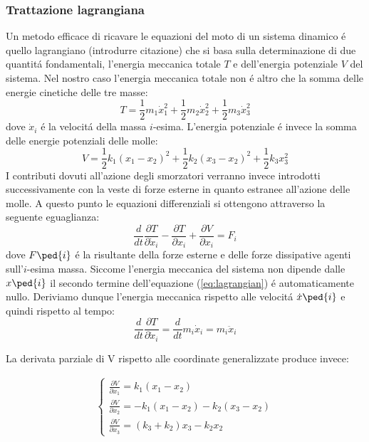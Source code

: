 \documentclass[12pt,a4paper]{article}
\begin{document}
 	\subsubsection[Lagrangiana]{Trattazione lagrangiana}
 		Un metodo efficace di ricavare le equazioni del moto di un sistema dinamico \'e quello lagrangiano (introdurre citazione) che si basa sulla determinazione di due quantit\'a fondamentali, l'energia meccanica totale $T$ e dell'energia potenziale $V$ del sistema. Nel nostro caso l'energia meccanica totale non \'e altro che la somma delle energie cinetiche delle tre masse:
 		\begin{equation}
 			T= \frac{1}{2} m_1 \dot x_1^2 +\frac{1}{2} m_2 \dot x_2^2+ \frac{1}{2}m_3 \dot x_3^2 
 			\label{eq:mechanical-energy}
 		\end{equation}
 		dove $\dot x_i$ \'e la velocit\'a della massa $i$-esima.
 		L'energia potenziale \'e invece la somma delle energie potenziali delle molle:
 		\begin{equation}
 			V= \frac{1}{2} k_1(x_1-x_2)^2+\frac{1}{2} k_2(x_3-x_2)^2 + \frac{1}{2} k_3 x_3^2
 			\label{eq:potential-energy}
 		\end{equation}
 		I contributi dovuti all'azione degli smorzatori verranno invece introdotti successivamente con la veste di forze esterne in quanto estranee all'azione delle molle.
 		A questo punto le equazioni differenziali si ottengono attraverso la seguente eguaglianza: 		
 		\begin{equation}
 			\frac{d}{dt} \frac{\partial T}{\partial \dot x_i} - \frac{\partial T}{\partial x_i} + \frac{\partial V}{\partial x_i}=F_i
 			\label{eq:lagrangian}
 		\end{equation}
 		dove $F\ped{i}$ \'e la risultante della forze esterne e delle forze dissipative agenti sull'$i$-esima massa. Siccome l'energia meccanica del sistema non dipende dalle $x\ped{i}$ il secondo termine dell'equazione (\ref{eq:lagrangian}) \'e automaticamente nullo. Deriviamo dunque l'energia meccanica rispetto alle velocit\'a $\dot x\ped{i}$ e quindi rispetto al tempo:
 		\begin{equation}
 			\frac{d}{dt} \frac{\partial T}{\partial \dot x_i}= \frac{d}{dt} m_i \dot{x}_i =m_i \ddot{x}_i
 			\label{eq:energie}
 		\end{equation}
 		
		La derivata parziale di V rispetto alle coordinate generalizzate produce invece:
		
		\begin{gather}
 		\begin{cases}
 		\frac{\partial V}{\partial x_1}= k_1(x_1 - x_2)
 		\\
 		\frac{\partial V}{\partial x_2} = - k_1(x_1 - x_2) - k_2(x_3 - x_2)
 		\\
 		\frac{\partial V}{\partial x_3} = (k_3 +k_2)x_3-k_2 x_2
 		\label{eq:potenziali}
		\end{cases}
		\end{gather}
		
\end{document}
